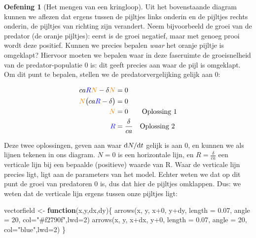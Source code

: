 \documentclass[
  a4paper,
]{scrbook}
\newenvironment{Shaded}{\begin{snugshade}}{\end{snugshade}}
\newcommand{\AttributeTok}[1]{\textcolor[rgb]{0.40,0.45,0.13}{#1}}
\newcommand{\ControlFlowTok}[1]{\textcolor[rgb]{0.00,0.23,0.31}{\textbf{#1}}}
\newcommand{\DecValTok}[1]{\textcolor[rgb]{0.68,0.00,0.00}{#1}}
\newcommand{\FloatTok}[1]{\textcolor[rgb]{0.68,0.00,0.00}{#1}}
\newcommand{\FunctionTok}[1]{\textcolor[rgb]{0.28,0.35,0.67}{#1}}
\newcommand{\NormalTok}[1]{\textcolor[rgb]{0.00,0.23,0.31}{#1}}
\newcommand{\OtherTok}[1]{\textcolor[rgb]{0.00,0.23,0.31}{#1}}
\newcommand{\SpecialCharTok}[1]{\textcolor[rgb]{0.37,0.37,0.37}{#1}}
\newcommand{\StringTok}[1]{\textcolor[rgb]{0.13,0.47,0.30}{#1}}
\theoremstyle{definition}
\newtheorem{exercise}{Oefening}[chapter]
\theoremstyle{remark}
\begin{document}
\begin{exercise}[Het mengen van een
kringloop]
Uit het bovenstaande diagram kunnen we aflezen dat ergens tussen de
pijltjes links onderin en de pijltjes rechts onderin, de pijltjes van
richting zijn verandert. Neem bijvoorbeeld de groei van de predator (de
oranje pijltjes): eerst is de groei negatief, maar met genoeg prooi
wordt deze positief. Kunnen we precies bepalen \emph{waar} het oranje
pijltje is omgeklapt? Hiervoor moeten we bepalen waar in deze faseruimte
de groeisnelheid van de predator-populatie 0 is: dit geeft precies aan
waar de pijl is omgeklapt. Om dit punt te bepalen, stellen we de
predatorvergelijking gelijk aan 0:

\begin{align*}
    \color{black}ca\color{blue}R\color{orange}N\color{black} - \delta \color{orange}N &= 0\\
    \color{orange}N\color{black} \big( \color{black}ca\color{blue}R\color{black} - \delta \big) &= 0 \\
    \color{orange}N\color{black} &= 0 \qquad \text{Oplossing 1} \\
    \color{blue}R\color{black} &= \frac{\delta}{ca} \quad \text{Oplossing 2}
\end{align*}

Deze twee oplossingen, geven aan waar \(\mathchoice{\frac{\mathrm{d}N}
{\mathrm{d}t}}{\mathrm{d}N/\mathrm{d}t}
{\mathrm{d}N/\mathrm{d}t}
{\mathrm{d}N/\mathrm{d}t}\) gelijk is aan 0, en kunnen we als lijnen
tekenen in ons diagram. \(N=0\) is een horizontale lijn, en
\(R=\frac{\delta}{ca}\) een verticale lijn bij een bepaalde (positieve)
waarde van R. Waar de verticale lijn precies ligt, ligt aan de
parameters van het model. Echter weten we dat op dit punt de groei van
predatoren 0 is, dus dat hier de pijltjes omklappen. Dus: we weten dat
de verticale lijn ergens tussen onze pijltjes ligt:

\begin{Shaded}
\begin{Highlighting}[]
\NormalTok{vectorfield }\OtherTok{\textless{}{-}} \ControlFlowTok{function}\NormalTok{(x,y,dx,dy)\{}
  \FunctionTok{arrows}\NormalTok{(x, y, x}\SpecialCharTok{+}\DecValTok{0}\NormalTok{, y}\SpecialCharTok{+}\NormalTok{dy, }\AttributeTok{length =} \FloatTok{0.07}\NormalTok{, }\AttributeTok{angle =} \DecValTok{20}\NormalTok{, }\AttributeTok{col=}\StringTok{"\#f2790f"}\NormalTok{,}\AttributeTok{lwd=}\DecValTok{2}\NormalTok{)}
  \FunctionTok{arrows}\NormalTok{(x, y, x}\SpecialCharTok{+}\NormalTok{dx, y}\SpecialCharTok{+}\DecValTok{0}\NormalTok{, }\AttributeTok{length =} \FloatTok{0.07}\NormalTok{, }\AttributeTok{angle =} \DecValTok{20}\NormalTok{, }\AttributeTok{col=}\StringTok{"blue"}\NormalTok{,}\AttributeTok{lwd=}\DecValTok{2}\NormalTok{)}
\NormalTok{\}}


\end{Highlighting}
\end{Shaded}
\end{exercise}
\end{document}
